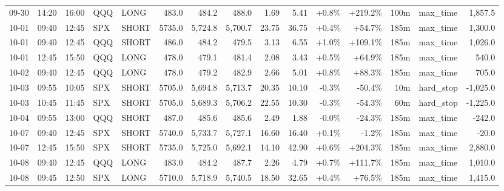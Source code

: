 \documentclass[11pt,a4paper,twoside]{article}
\begin{document}
\begin{landscape}
\begin{center}
\begin{longtable}{>{\color{txtmain}}l l l l l r r r r r r r r >{\color{txtmain}}l r}
09-30 & 14:20 & 16:00 & QQQ & LONG & 483.0 & 484.2 & 488.0 & 1.69 & 5.41 & \textcolor{wingreen}{+0.8\%} & \textcolor{wingreen}{+219.2\%} & 100m & max\_time & \textcolor{wingreen}{1,857.5} \\
10-01 & 09:40 & 12:45 & SPX & SHORT & 5735.0 & 5,724.8 & 5,700.7 & 23.75 & 36.75 & \textcolor{wingreen}{+0.4\%} & \textcolor{wingreen}{+54.7\%} & 185m & max\_time & \textcolor{wingreen}{1,300.0} \\
10-01 & 09:40 & 12:45 & QQQ & SHORT & 486.0 & 484.2 & 479.5 & 3.13 & 6.55 & \textcolor{wingreen}{+1.0\%} & \textcolor{wingreen}{+109.1\%} & 185m & max\_time & \textcolor{wingreen}{1,026.0} \\
10-01 & 12:45 & 15:50 & QQQ & LONG & 478.0 & 479.1 & 481.4 & 2.08 & 3.43 & \textcolor{wingreen}{+0.5\%} & \textcolor{wingreen}{+64.9\%} & 185m & max\_time & \textcolor{wingreen}{540.0} \\
10-02 & 09:40 & 12:45 & QQQ & LONG & 478.0 & 479.2 & 482.9 & 2.66 & 5.01 & \textcolor{wingreen}{+0.8\%} & \textcolor{wingreen}{+88.3\%} & 185m & max\_time & \textcolor{wingreen}{705.0} \\
10-03 & 09:55 & 10:05 & SPX & SHORT & 5705.0 & 5,694.8 & 5,713.7 & 20.35 & 10.10 & \textcolor{lossred}{-0.3\%} & \textcolor{lossred}{-50.4\%} & 10m & hard\_stop & \textcolor{lossred}{-1,025.0} \\
10-03 & 10:45 & 11:45 & SPX & SHORT & 5705.0 & 5,689.3 & 5,706.2 & 22.55 & 10.30 & \textcolor{lossred}{-0.3\%} & \textcolor{lossred}{-54.3\%} & 60m & hard\_stop & \textcolor{lossred}{-1,225.0} \\
10-04 & 09:55 & 13:00 & QQQ & SHORT & 487.0 & 485.6 & 485.6 & 2.49 & 1.88 & \textcolor{lossred}{-0.0\%} & \textcolor{lossred}{-24.3\%} & 185m & max\_time & \textcolor{lossred}{-242.0} \\
10-07 & 09:40 & 12:45 & SPX & SHORT & 5740.0 & 5,733.7 & 5,727.1 & 16.60 & 16.40 & \textcolor{wingreen}{+0.1\%} & \textcolor{lossred}{-1.2\%} & 185m & max\_time & \textcolor{lossred}{-20.0} \\
10-07 & 12:45 & 15:50 & SPX & SHORT & 5735.0 & 5,725.0 & 5,692.1 & 14.10 & 42.90 & \textcolor{wingreen}{+0.6\%} & \textcolor{wingreen}{+204.3\%} & 185m & max\_time & \textcolor{wingreen}{2,880.0} \\
10-08 & 09:40 & 12:45 & QQQ & LONG & 483.0 & 484.2 & 487.7 & 2.26 & 4.79 & \textcolor{wingreen}{+0.7\%} & \textcolor{wingreen}{+111.7\%} & 185m & max\_time & \textcolor{wingreen}{1,010.0} \\
10-08 & 09:45 & 12:50 & SPX & LONG & 5710.0 & 5,718.9 & 5,740.5 & 18.50 & 32.65 & \textcolor{wingreen}{+0.4\%} & \textcolor{wingreen}{+76.5\%} & 185m & max\_time & \textcolor{wingreen}{1,415.0} \\

\end{longtable}
\end{center}
\end{landscape}
\end{document}
